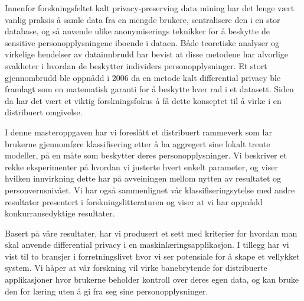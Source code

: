 \noindent 
Innenfor forskningsfeltet kalt privacy-preserving data mining har det lenge v{\ae}rt vanlig praksis {\aa} samle data fra en mengde brukere, sentralisere den i en stor database, og s{\aa} anvende ulike anonymiserings teknikker for {\aa} beskytte de sensitive personopplysningene iboende i dataen. B{\aa}de teoretiske analyser og virkelige hendelser av datainnbrudd har bevist at disse metodene har alvorlige svakheter i hvordan de beskytter individers personopplysninger. Et stort gjennombrudd ble oppn{\aa}dd i 2006 da en metode kalt differential privacy ble framlagt som en matematisk garanti for {\aa} beskytte hver rad i et datasett. Siden da har det v{\ae}rt et viktig forskningsfokus {\aa} f{\aa} dette konseptet til {\aa} virke i en distribuert omgivelse.

I denne masteroppgaven har vi foresl{\aa}tt et distribuert rammeverk som lar brukerne gjennomf{\o}re klassifisering etter {\aa} ha aggregert sine lokalt trente modeller, p{\aa} en m{\aa}te som beskytter deres personopplysninger. Vi beskriver et rekke eksperimenter p{\aa} hvordan vi justerte hvert enkelt parameter, og viser hvilken innvirkning dette har p{\aa} avveiningen mellom nytten av resultatet og personvernsniv{\aa}et. Vi har ogs{\aa} sammenlignet v{\aa}r klassifiseringsytelse med andre resultater presentert i forskningslitteraturen og viser at vi har oppn{\aa}dd konkurransedyktige resultater.     

Basert p{\aa} v{\aa}re resultater, har vi produsert et sett med kriterier for hvordan man skal anvende differential privacy i en maskinl{\ae}ringsapplikasjon. I tillegg har vi vist til to bransjer i forretningslivet hvor vi ser potensiale for {\aa} skape et 
vellykket system. Vi h{\aa}per at v{\aa}r forskning vil virke banebrytende for distribuerte applikasjoner hvor brukerne beholder kontroll over deres egen data, og kan bruke den for l{\ae}ring uten {\aa} gi fra seg sine personopplysninger.   

\cleardoublepage